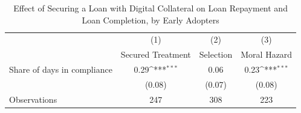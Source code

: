 \begin{table}[htbp]\centering
\def\sym#1{\ifmmode^{#1}\else\(^{#1}\)\fi}
\caption{Effect of Securing a Loan with Digital Collateral on Loan Repayment and Loan Completion, by Early Adopters\label{LASMH\_complete\_earlyadopt\_LATE\_200}}
\begin{tabular}{l*{3}{c}}
\toprule
                    &\multicolumn{1}{c}{(1)}&\multicolumn{1}{c}{(2)}&\multicolumn{1}{c}{(3)}\\
                    &\multicolumn{1}{c}{Secured Treatment}&\multicolumn{1}{c}{Selection}&\multicolumn{1}{c}{Moral Hazard}\\
\midrule
Share of days in compliance&        0.29\sym{***}&        0.06         &        0.23\sym{***}\\
                    &      (0.08)         &      (0.07)         &      (0.08)         \\
\midrule
Observations        &         247         &         308         &         223         \\
\bottomrule
\end{tabular}
\end{table}
